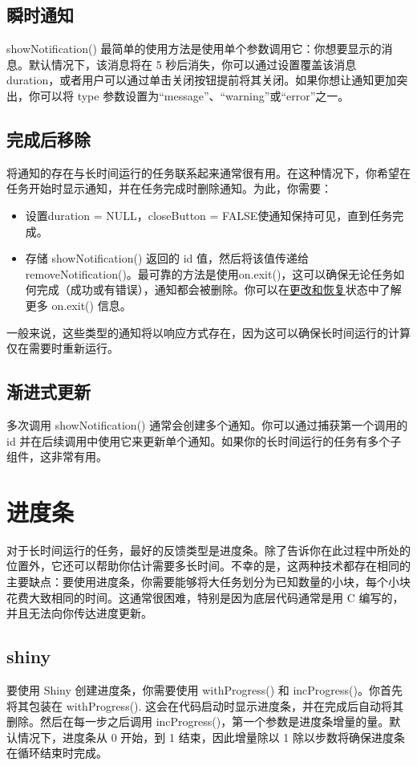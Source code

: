 \subsection{瞬时通知}
showNotification() 最简单的使用方法是使用单个参数调用它：你想要显示的消息。默认情况下，该消息将在 5 秒后消失，你可以通过设置覆盖该消息 duration，或者用户可以通过单击关闭按钮提前将其关闭。如果你想让通知更加突出，你可以将 type 参数设置为“message”、“warning”或“error”之一。

\subsection{完成后移除}
将通知的存在与长时间运行的任务联系起来通常很有用。在这种情况下，你希望在任务开始时显示通知，并在任务完成时删除通知。为此，你需要：
\begin{itemize}
    \item 设置duration = NULL，closeButton = FALSE使通知保持可见，直到任务完成。
    \item 存储 showNotification() 返回的 id 值，然后将该值传递给 removeNotification()。最可靠的方法是使用on.exit()，这可以确保无论任务如何完成（成功或有错误），通知都会被删除。你可以在\href{https://withr.r-lib.org/articles/changing-and-restoring-state.html}{更改和恢复}状态中了解更多 on.exit() 信息。
\end{itemize}

一般来说，这些类型的通知将以响应方式存在，因为这可以确保长时间运行的计算仅在需要时重新运行。
\subsection{渐进式更新}
多次调用 showNotification() 通常会创建多个通知。你可以通过捕获第一个调用的 id 并在后续调用中使用它来更新单个通知。如果你的长时间运行的任务有多个子组件，这非常有用。
\section{进度条}
对于长时间运行的任务，最好的反馈类型是进度条。除了告诉你在此过程中所处的位置外，它还可以帮助你估计需要多长时间。不幸的是，这两种技术都存在相同的主要缺点：要使用进度条，你需要能够将大任务划分为已知数量的小块，每个小块花费大致相同的时间。这通常很困难，特别是因为底层代码通常是用 C 编写的，并且无法向你传达进度更新。
\subsection{shiny}
要使用 Shiny 创建进度条，你需要使用 withProgress() 和 incProgress()。你首先将其包装在 withProgress(). 这会在代码启动时显示进度条，并在完成后自动将其删除。然后在每一步之后调用 incProgress()，第一个参数是进度条增量的量。默认情况下，进度条从 0 开始，到 1 结束，因此增量除以 1 除以步数将确保进度条在循环结束时完成。
